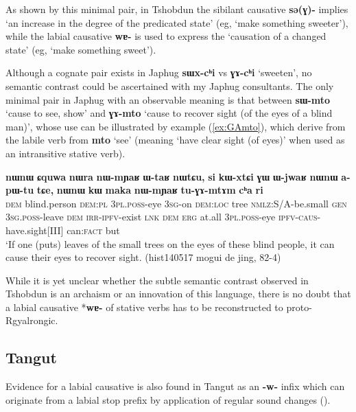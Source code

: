 \documentclass[oneside,a4paper,11pt]{article}
\newcommand{\ipa}[1]{\textbf{{\phon\mbox{#1}}}} %
\newcommand{\forme}[2]{\ipa{#1} `#2'}
\newcommand{\refb}[1]{(\ref{#1})}
\begin{document}
As shown by this minimal pair, in Tshobdun the sibilant causative \ipa{sə(ɣ)-} implies `an increase in the degree  of the predicated state' (eg, `make something sweeter'), while the labial causative \ipa{wɐ-} is used to express the `causation of a changed state' (eg, `make something sweet').

Although a cognate pair exists in Japhug \ipa{sɯx-cʰi} vs \ipa{ɣɤ-cʰi} `sweeten', no semantic contrast could be ascertained with my Japhug consultants. The only minimal pair in Japhug with an observable meaning is that between \forme{sɯ-mto}{cause to see, show} and \forme{ɣɤ-mto}{cause to recover sight (of the eyes of a blind man)}, whose use can be illustrated by example \refb{ex:GAmto}, which derive from the labile verb from \forme{mto}{see} (meaning `have clear sight (of eyes)' when used as an intransitive stative verb).

\begin{exe}
\ex \label{ex:GAmto}
\gll 
\ipa{nɯnɯ} 	\ipa{ɕquwa} 	\ipa{nɯra} 	\ipa{nɯ-mɲaʁ} 	\ipa{ɯ-taʁ} 	\ipa{nɯtɕu,} 	\ipa{si} 	\ipa{kɯ-xtɕi} 	\ipa{ɣɯ} 	\ipa{ɯ-jwaʁ} 	\ipa{nɯnɯ} 	\ipa{a-pɯ-tu} 	\ipa{tɕe,} 	\ipa{nɯnɯ} 	\ipa{kɯ} 	\ipa{maka} 	\ipa{nɯ-mɲaʁ} 	\ipa{tu-ɣɤ-mtɤm} 	\ipa{cʰa} 	\ipa{ri} \\
\textsc{dem} blind.person \textsc{dem:pl} \textsc{3pl.poss}-eye \textsc{3sg}-on \textsc{dem:loc} tree \textsc{nmlz}:S/A-be.small \textsc{gen} \textsc{3sg.poss}-leave \textsc{dem} \textsc{irr-ipfv}-exist \textsc{lnk} \textsc{dem} \textsc{erg} at.all \textsc{3pl.poss}-eye \textsc{ipfv-caus}-have.sight[III] can:\textsc{fact} but \\
\glt `If one (puts) leaves of the small trees on the eyes of these blind people, it can cause their eyes to recover sight. (hist140517 mogui de jing, 82-4)
\end{exe}

While it is yet unclear whether the subtle semantic contrast observed in Tshobdun is an archaism or an innovation of this language, there is no doubt that a labial causative *\ipa{wɐ-} of stative verbs has to be reconstructed to proto-Rgyalrongic. 

\subsection{Tangut}
Evidence for a labial causative is also found in Tangut as an \ipa{-w-} infix  which can originate from a labial stop prefix by application of regular sound changes (\citealt[253-4]{jacques14esquisse}).
\end{document}
